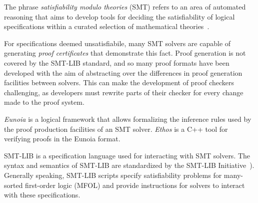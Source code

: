 \documentclass[class=llncs, crop=false]{standalone}
\begin{document}
%
The phrase \emph{satisfiability modulo theories} (SMT)
refers to an area of automated reasoning that aims
to develop tools for deciding the satisfiability of
logical specifications within a curated selection of
mathematical theories~\cite{Barrett2021}.
%
%

For specifications deemed unsatisfiabile, many SMT solvers
are capable of generating \emph{proof certificates}
that demonstrate this fact.
%
Proof generation is not covered by the SMT-LIB standard,
and so many proof formats have been developed with the
aim of abstracting over the differences in
proof generation facilities between solvers.
%
This can make the development of proof checkers challenging,
as developers must rewrite parts of their checker for every
change made to the proof system.

\textit{Eunoia} is a logical framework that allows formalizing
the inference rules used by the proof production facilities
of an SMT solver.
%
\textit{Ethos} is a C++ tool for verifying proofs in the
Eunoia format.

SMT-LIB is a specification language used for interacting
with SMT solvers. The syntax and semantics of SMT-LIB are
standardized by the
SMT-LIB Initiative~\autocite{Barrett2015-standard}).
%
Generally speaking, SMT-LIB scripts specify satisfiability
problems for many-sorted first-order logic (MFOL) and
provide instructions for solvers to interact with these
specifications.
%
\end{document}
